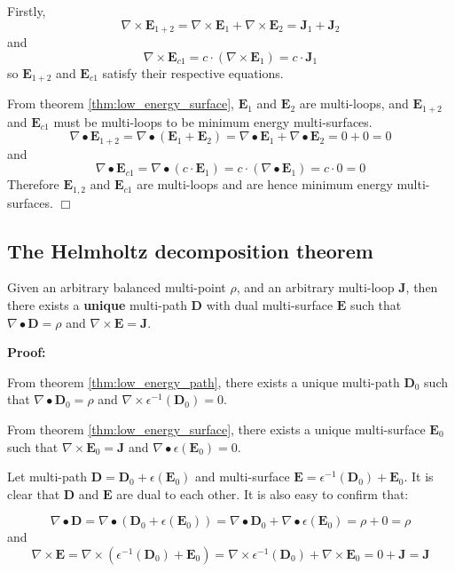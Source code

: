 Firstly, 
\[\nabla \times \mathbf{E}_{1+2} = \nabla \times \mathbf{E}_1 + \nabla \times \mathbf{E}_2 = \mathbf{J}_1 + \mathbf{J}_2\]
and
\[\nabla \times \mathbf{E}_{c1} = c \cdot (\nabla \times \mathbf{E}_1) = c \cdot \mathbf{J}_1\]
so \(\mathbf{E}_{1+2}\) and \(\mathbf{E}_{c1}\) satisfy their respective equations.

From theorem \ref{thm:low_energy_surface}, \(\mathbf{E}_1\) and \(\mathbf{E}_2\) are multi-loops, and \(\mathbf{E}_{1+2}\) and \(\mathbf{E}_{c1}\) must be multi-loops to be minimum energy multi-surfaces. 
\[\nabla \bullet \mathbf{E}_{1+2} = \nabla \bullet (\mathbf{E}_1 + \mathbf{E}_2) = \nabla \bullet \mathbf{E}_1 + \nabla \bullet \mathbf{E}_2 = 0 + 0 = 0\]
and
\[\nabla \bullet \mathbf{E}_{c1} = \nabla \bullet (c \cdot \mathbf{E}_1) = c \cdot (\nabla \bullet \mathbf{E}_1) = c \cdot 0 = 0\]
Therefore \(\mathbf{E}_{1,2}\) and \(\mathbf{E}_{c1}\) are multi-loops and are hence minimum energy multi-surfaces. \(\Box\)



\subsection{The Helmholtz decomposition theorem}

\begin{thm}\label{thm:exactly_one_solution}   
Given an arbitrary balanced multi-point \(\rho\), and an arbitrary multi-loop \(\mathbf{J}\), then there exists a {\bf unique} multi-path \(\mathbf{D}\) with dual multi-surface \(\mathbf{E}\) such that \(\nabla \bullet \mathbf{D} = \rho\) and \(\nabla \times \mathbf{E} = \mathbf{J}\).
\end{thm}
\textbf{Proof:}

From theorem \ref{thm:low_energy_path}, there exists a unique multi-path \(\mathbf{D}_0\) such that \(\nabla \bullet \mathbf{D}_0 = \rho\) and \(\nabla \times \epsilon^{-1}(\mathbf{D}_0) = 0\). 

From theorem \ref{thm:low_energy_surface}, there exists a unique multi-surface \(\mathbf{E}_0\) such that \(\nabla \times \mathbf{E}_0 = \mathbf{J}\) and \(\nabla \bullet \epsilon(\mathbf{E}_0) = 0\). 

Let multi-path \(\mathbf{D} = \mathbf{D}_0 + \epsilon(\mathbf{E}_0)\) and multi-surface \(\mathbf{E} = \epsilon^{-1}(\mathbf{D}_0) + \mathbf{E}_0\). It is clear that \(\mathbf{D}\) and \(\mathbf{E}\) are dual to each other. It is also easy to confirm that:

\[\nabla \bullet \mathbf{D} = \nabla \bullet (\mathbf{D}_0 + \epsilon(\mathbf{E}_0)) = \nabla \bullet \mathbf{D}_0 + \nabla \bullet \epsilon(\mathbf{E}_0) = \rho + 0 = \rho\]      
and 
\[\nabla \times \mathbf{E} = \nabla \times (\epsilon^{-1}(\mathbf{D}_0) + \mathbf{E}_0) = \nabla \times \epsilon^{-1}(\mathbf{D}_0) + \nabla \times \mathbf{E}_0 = 0 + \mathbf{J} = \mathbf{J}\]


